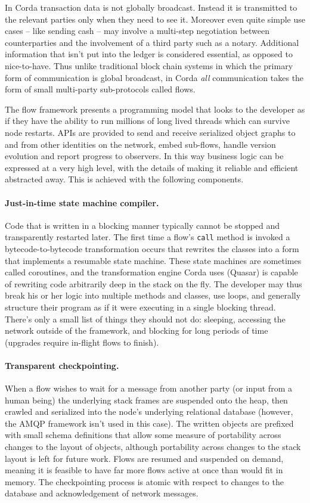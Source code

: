 \documentclass{article}
\begin{document}
In Corda transaction data is not globally broadcast. Instead it is transmitted to the relevant parties only when
they need to see it. Moreover even quite simple use cases -- like sending cash -- may involve a multi-step
negotiation between counterparties and the involvement of a third party such as a notary. Additional information
that isn't put into the ledger is considered essential, as opposed to nice-to-have. Thus unlike traditional block
chain systems in which the primary form of communication is global broadcast, in Corda \emph{all} communication
takes the form of small multi-party sub-protocols called flows.

The flow framework presents a programming model that looks to the developer as if they have the ability to run
millions of long lived threads which can survive node restarts. APIs are provided to send and receive serialized
object graphs to and from other identities on the network, embed sub-flows, handle version evolution and report
progress to observers. In this way business logic can be expressed at a very high level, with the details of making
it reliable and efficient abstracted away. This is achieved with the following components.

\paragraph{Just-in-time state machine compiler.}Code that is written in a blocking manner typically cannot be
stopped and transparently restarted later. The first time a flow's \texttt{call} method is invoked a
bytecode-to-bytecode transformation occurs that rewrites the classes into a form that implements a resumable state
machine. These state machines are sometimes called coroutines, and the transformation engine Corda uses (Quasar) is
capable of rewriting code arbitrarily deep in the stack on the fly. The developer may thus break his or her logic
into multiple methods and classes, use loops, and generally structure their program as if it were executing in a
single blocking thread. There's only a small list of things they should not do: sleeping, accessing the
network outside of the framework, and blocking for long periods of time (upgrades require in-flight flows to finish).

\paragraph{Transparent checkpointing.}When a flow wishes to wait for a message from another party (or input from a
human being) the underlying stack frames are suspended onto the heap, then crawled and serialized into the node's
underlying relational database (however, the AMQP framework isn't used in this case). The written objects are
prefixed with small schema definitions that allow some measure of portability across changes to the layout of
objects, although portability across changes to the stack layout is left for future work. Flows are resumed and
suspended on demand, meaning it is feasible to have far more flows active at once than would fit in memory. The
checkpointing process is atomic with respect to changes to the database and acknowledgement of network messages.
\end{document}
